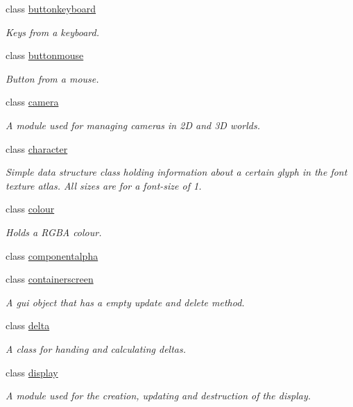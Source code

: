\begin{DoxyCompactItemize}
class \hyperlink{classflounder_1_1buttonkeyboard}{buttonkeyboard}
\begin{DoxyCompactList}\small\item\em Keys from a keyboard. \end{DoxyCompactList}\item 
class \hyperlink{classflounder_1_1buttonmouse}{buttonmouse}
\begin{DoxyCompactList}\small\item\em Button from a mouse. \end{DoxyCompactList}\item 
class \hyperlink{classflounder_1_1camera}{camera}
\begin{DoxyCompactList}\small\item\em A module used for managing cameras in 2D and 3D worlds. \end{DoxyCompactList}\item 
class \hyperlink{classflounder_1_1character}{character}
\begin{DoxyCompactList}\small\item\em Simple data structure class holding information about a certain glyph in the font texture atlas. All sizes are for a font-\/size of 1. \end{DoxyCompactList}\item 
class \hyperlink{classflounder_1_1colour}{colour}
\begin{DoxyCompactList}\small\item\em Holds a R\+G\+BA colour. \end{DoxyCompactList}\item 
class \hyperlink{classflounder_1_1componentalpha}{componentalpha}
\item 
class \hyperlink{classflounder_1_1containerscreen}{containerscreen}
\begin{DoxyCompactList}\small\item\em A gui object that has a empty update and delete method. \end{DoxyCompactList}\item 
class \hyperlink{classflounder_1_1delta}{delta}
\begin{DoxyCompactList}\small\item\em A class for handing and calculating deltas. \end{DoxyCompactList}\item 
class \hyperlink{classflounder_1_1display}{display}
\begin{DoxyCompactList}\small\item\em A module used for the creation, updating and destruction of the display. \end{DoxyCompactList}\item 

\end{DoxyCompactItemize}
